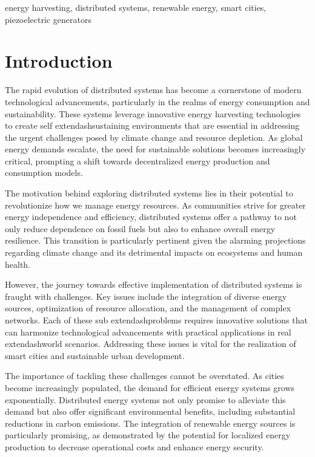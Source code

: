 \documentclass[runningheads]{llncs}
\begin{document}
\begin{keywords}
energy harvesting, distributed systems, renewable energy, smart cities, piezoelectric generators
\end{keywords}

\section{Introduction}
The rapid evolution of distributed systems has become a cornerstone of modern technological advancements, particularly in the realms of energy consumption and sustainability. These systems leverage innovative energy harvesting technologies to create self	extendash{}sustaining environments that are essential in addressing the urgent challenges posed by climate change and resource depletion. As global energy demands escalate, the need for sustainable solutions becomes increasingly critical, prompting a shift towards decentralized energy production and consumption models.

The motivation behind exploring distributed systems lies in their potential to revolutionize how we manage energy resources. As communities strive for greater energy independence and efficiency, distributed systems offer a pathway to not only reduce dependence on fossil fuels but also to enhance overall energy resilience. This transition is particularly pertinent given the alarming projections regarding climate change and its detrimental impacts on ecosystems and human health.

However, the journey towards effective implementation of distributed systems is fraught with challenges. Key issues include the integration of diverse energy sources, optimization of resource allocation, and the management of complex networks. Each of these sub	extendash{}problems requires innovative solutions that can harmonize technological advancements with practical applications in real	extendash{}world scenarios. Addressing these issues is vital for the realization of smart cities and sustainable urban development.

The importance of tackling these challenges cannot be overstated. As cities become increasingly populated, the demand for efficient energy systems grows exponentially. Distributed energy systems not only promise to alleviate this demand but also offer significant environmental benefits, including substantial reductions in carbon emissions. The integration of renewable energy sources is particularly promising, as demonstrated by the potential for localized energy production to decrease operational costs and enhance energy security.
\end{document}
